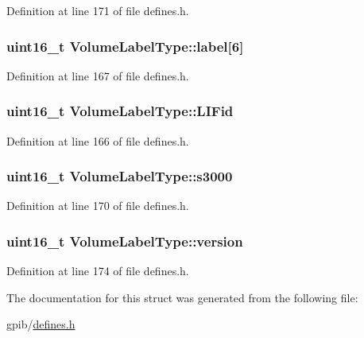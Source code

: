 Definition at line 171 of file defines.\-h.

\hypertarget{structVolumeLabelType_a265fc834b203868cc48482a8be64f60c}{
\subsubsection[{label}]{\setlength{\rightskip}{0pt plus 5cm}uint16\-\_\-t Volume\-Label\-Type\-::label\mbox{[}6\mbox{]}}}\label{structVolumeLabelType_a265fc834b203868cc48482a8be64f60c}


Definition at line 167 of file defines.\-h.

\hypertarget{structVolumeLabelType_a16bdde2d19114ac3238477c29fe75b4a}{
\subsubsection[{L\-I\-Fid}]{\setlength{\rightskip}{0pt plus 5cm}uint16\-\_\-t Volume\-Label\-Type\-::\-L\-I\-Fid}}\label{structVolumeLabelType_a16bdde2d19114ac3238477c29fe75b4a}


Definition at line 166 of file defines.\-h.

\hypertarget{structVolumeLabelType_ac7659e37fbb2bcb0b66c0a0172f9b16c}{
\subsubsection[{s3000}]{\setlength{\rightskip}{0pt plus 5cm}uint16\-\_\-t Volume\-Label\-Type\-::s3000}}\label{structVolumeLabelType_ac7659e37fbb2bcb0b66c0a0172f9b16c}


Definition at line 170 of file defines.\-h.

\hypertarget{structVolumeLabelType_a59f56fd1f28549bc625aeaaa57c8d0d2}{
\subsubsection[{version}]{\setlength{\rightskip}{0pt plus 5cm}uint16\-\_\-t Volume\-Label\-Type\-::version}}\label{structVolumeLabelType_a59f56fd1f28549bc625aeaaa57c8d0d2}


Definition at line 174 of file defines.\-h.



The documentation for this struct was generated from the following file\-:\begin{DoxyCompactItemize}
\item 
gpib/\hyperlink{defines_8h}{defines.\-h}\end{DoxyCompactItemize}
